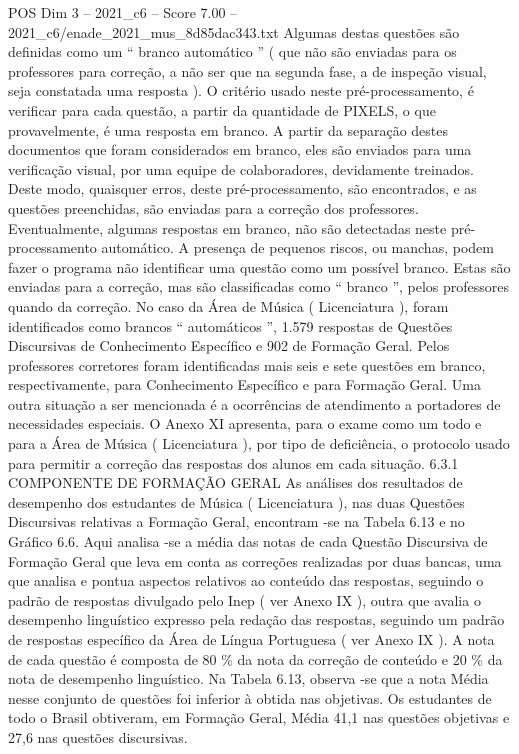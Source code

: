 \begin{textsample}{POS Dim 3 – 2021\_c6 – Score 7.00 – 2021\_c6/enade\_2021\_mus\_8d85dac343.txt}
Algumas destas questões são definidas como um “ branco automático ” ( que não são enviadas para os professores para correção, a não ser que na segunda fase, a de inspeção visual, seja constatada uma resposta ).
O critério usado neste pré-processamento, é verificar para cada questão, a partir da quantidade de PIXELS, o que provavelmente, é uma resposta em branco.
A partir da separação destes documentos que foram considerados em branco, eles são enviados para uma verificação visual, por uma equipe de colaboradores, devidamente treinados.
Deste modo, quaisquer erros, deste pré-processamento, são encontrados, e as questões preenchidas, são enviadas para a correção dos professores.
Eventualmente, algumas respostas em branco, não são detectadas neste pré-processamento automático.
A presença de pequenos riscos, ou manchas, podem fazer o programa não identificar uma questão como um possível branco.
Estas são enviadas para a correção, mas são classificadas como “ branco ”, pelos professores quando da correção.
No caso da Área de Música ( Licenciatura ), foram identificados como brancos “ automáticos ”, 1.579 respostas de Questões Discursivas de Conhecimento Específico e 902 de Formação Geral.
Pelos professores corretores foram identificadas mais seis e sete questões em branco, respectivamente, para Conhecimento Específico e para Formação Geral.
Uma outra situação a ser mencionada é a ocorrências de atendimento a portadores de necessidades especiais.
O Anexo XI apresenta, para o exame como um todo e para a Área de Música ( Licenciatura ), por tipo de deficiência, o protocolo usado para permitir a correção das respostas dos alunos em cada situação. 6.3.1 COMPONENTE DE FORMAÇÃO GERAL As análises dos resultados de desempenho dos estudantes de Música ( Licenciatura ), nas duas Questões Discursivas relativas a Formação Geral, encontram -se na Tabela 6.13 e no Gráfico 6.6.
Aqui analisa -se a média das notas de cada Questão Discursiva de Formação Geral que leva em conta as correções realizadas por duas bancas, uma que analisa e pontua aspectos relativos ao conteúdo das respostas, seguindo o padrão de respostas divulgado pelo Inep ( ver Anexo IX ), outra que avalia o desempenho linguístico expresso pela redação das respostas, seguindo um padrão de respostas específico da Área de Língua Portuguesa ( ver Anexo IX ).
A nota de cada questão é composta de 80 \% da nota da correção de conteúdo e 20 \% da nota de desempenho linguístico.
Na Tabela 6.13, observa -se que a nota Média nesse conjunto de questões foi inferior à obtida nas objetivas.
Os estudantes de todo o Brasil obtiveram, em Formação Geral, Média 41,1 nas questões objetivas e 27,6 nas questões discursivas.

\end{textsample}
